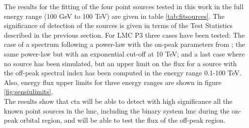 \documentclass[main.tex]{subfiles}
\begin{document}
The results for the fitting of the four point sources tested in this work in the full energy range (100 GeV to 100 TeV) are given in table \ref{tab:fitsources}. The significance of detection of the sources is given in terms of the Test Statistics described in the previous section. For LMC P3 three cases have been tested: The case of a spectrum following a power-law with the on-peak parameters from \cite{2017HESSLMCP3}; the same power-law but with an exponential cut-off at 10 TeV; and a last case where no source has been simulated, but an upper limit on the flux for a source with the off-peak spectral index has been computed in the energy range 0.1-100 TeV. Also, energy flux upper limits for three energy ranges are shown in figure \ref{fig:sensiulimits}.\\
The results show that \gls{cta} will be able to detect with high significance all the known point sources in the \gls{lmc}, including the binary system \gls{lmc} during the on-peak orbital region, and will be able to test the flux of the off-peak region. 
\end{document}
